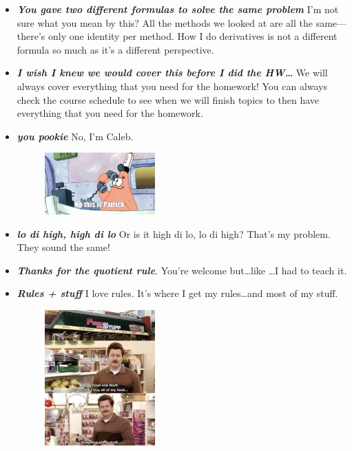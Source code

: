 \documentclass[11pt,letterpaper]{article}
\begin{document}
\begin{itemize}
 \item {\bfseries\itshape You gave two different formulas to solve the same problem} I'm not sure what you mean by this? All the methods we looked at are all the same---there's only one identity per method. How I do derivatives is not a different formula so much as it's a different perspective. 
 
 \item {\bfseries\itshape I wish I knew we would cover this before I did the HW\dots} We will always cover everything that you need for the homework! You can always check the course schedule to see when we will finish topics to then have everything that you need for the homework. 

\item {\bfseries\itshape you pookie} No, I'm Caleb.
	\begin{figure}[H]
	\centering
	\includegraphics[width=0.40\textwidth]{images/patrick.png}
	\end{figure}

\item {\bfseries\itshape lo di high, high di lo} Or is it high di lo, lo di high? That's my problem. They sound the same!

\item {\bfseries\itshape Thanks for the quotient rule}. You're welcome but\dots like \dots I had to teach it.

\item {\bfseries\itshape Rules + stuff} I love rules. It's where I get my rules\dots and most of my stuff.
	\begin{figure}[H]
	\centering
	\includegraphics[width=0.40\textwidth]{images/ron.png}
	\end{figure}


\end{itemize}
\end{document}
